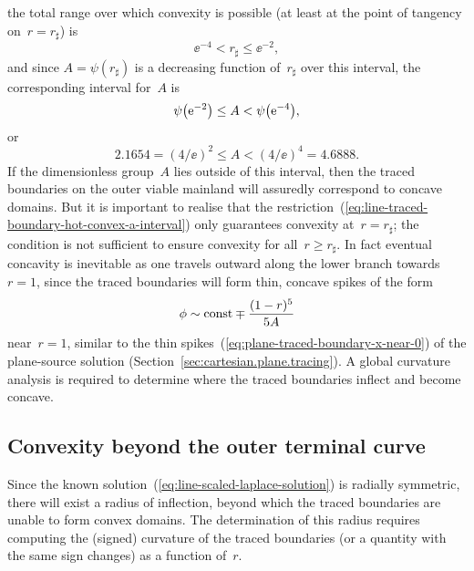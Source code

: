 the total range over which convexity is possible
(at least at the point of tangency on~$r = r_\sharp$)
is
\begin{equation}
  \ee^{-4} < r_\sharp \le \ee^{-2},
  \label{eq:line-traced-boundary-hot-convex-r-sharp-interval}
\end{equation}
and since $A = \psi (r_\sharp)$ is a decreasing function of~$r_\sharp$
over this interval,
the corresponding interval for~$A$ is
\[
  \psi \roundbr*{\ee^{-2}} \le A < \psi \roundbr*{\ee^{-4}},
\]
or
\begin{equation}
  2.1654 = (4 / \ee)^2 \le A < (4 / \ee)^4 = 4.6888.
  \label{eq:line-traced-boundary-hot-convex-a-interval}
\end{equation}
If the dimensionless group~$A$ lies outside of this interval,
then the traced boundaries on the outer viable mainland
will assuredly correspond to concave domains.
But it is important to realise that
the restriction~(\ref{eq:line-traced-boundary-hot-convex-a-interval})
only guarantees convexity at~$r = r_\sharp$;
the condition is not sufficient to ensure convexity for all~$r \ge r_\sharp$.
In fact eventual concavity is inevitable
as one travels outward along the lower branch towards~$r = 1$,
since the traced boundaries will form thin, concave spikes of the form
\begin{equation}
  \phi \sim \mathrm{const} \mp \frac{(1 - r)^5}{5 A}
  \label{eq:line-traced-boundary-r-near-1}
\end{equation}
near~$r = 1$,
similar to the thin spikes~(\ref{eq:plane-traced-boundary-x-near-0})
of the plane-source solution (Section~\ref{sec:cartesian.plane.tracing}).
A global curvature analysis is required
to determine where the traced boundaries inflect
and become concave.

\subsection{Convexity beyond the outer terminal curve}
\label{sec:line.convex.beyond}

Since the known solution~(\ref{eq:line-scaled-laplace-solution})
is radially symmetric,
there will exist a radius of inflection,
beyond which the traced boundaries are unable to form convex domains.
The determination of this radius requires
computing the (signed) curvature of the traced boundaries
(or a quantity with the same sign changes)
as a function of~$r$.

